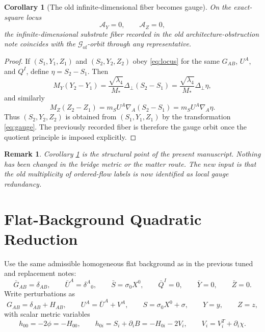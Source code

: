 \documentclass[11pt]{article}
\newcommand{\AY}{\mathcal A_Y}
\newcommand{\AZ}{\mathcal A_Z}
\newcommand{\GaugeGroup}{\mathscr G_{\mathrm{of}}}
\newtheorem{remark}{Remark}
\newtheorem{corollary}{Corollary}
\begin{document}
\begin{corollary}[The old infinite-dimensional fiber becomes gauge]
\label{cor:fiber}
On the exact-square locus
\begin{equation}
\AY=0,
\qquad
\AZ=0,
\label{eq:locus}
\end{equation}
the infinite-dimensional substrate fiber recorded in the old architecture-obstruction note coincides with the \(\GaugeGroup\)-orbit through any representative.
\end{corollary}

\begin{proof}
If \((S_1,Y_1,Z_1)\) and \((S_2,Y_2,Z_2)\) obey \eqref{eq:locus} for the same \(G_{AB}\), \(U^A\), and \(Q^I\), define \(\eta=S_2-S_1\). Then
\[
M_Y(Y_2-Y_1)
=
\frac{\sqrt{\lambda_4}}{M_*}\Delta_\perp(S_2-S_1)
=
\frac{\sqrt{\lambda_4}}{M_*}\Delta_\perp\eta,
\]
and similarly
\[
M_Z(Z_2-Z_1)
=
m_S U^A\nabla_A(S_2-S_1)
=
m_S U^A\nabla_A\eta.
\]
Thus \((S_2,Y_2,Z_2)\) is obtained from \((S_1,Y_1,Z_1)\) by the transformation \eqref{eq:gauge}. The previously recorded fiber is therefore the gauge orbit once the quotient principle is imposed explicitly.
\end{proof}

\begin{remark}
Corollary \ref{cor:fiber} is the structural point of the present manuscript. Nothing has been changed in the bridge metric or the matter route. The new input is that the old multiplicity of ordered-flow labels is now identified as local gauge redundancy.
\end{remark}

\section{Flat-Background Quadratic Reduction}

Use the same admissible homogeneous flat background as in the previous tuned and replacement notes:
\begin{equation}
\bar G_{AB}=\delta_{AB},
\qquad
\bar U^A=\delta^A{}_0,
\qquad
\bar S=\sigma_0X^0,
\qquad
\bar Q^I=0,
\qquad
\bar Y=0,
\qquad
\bar Z=0.
\label{eq:background}
\end{equation}
Write perturbations as
\begin{equation}
G_{AB}=\delta_{AB}+H_{AB},
\qquad
U^A=\bar U^A+V^A,
\qquad
S=\sigma_0X^0+\sigma,
\qquad
Y=y,
\qquad
Z=z,
\label{eq:perturb}
\end{equation}
with scalar metric variables
\begin{equation}
h_{00}=-2\phi=-H_{00},
\qquad
h_{0i}=S_i+\partial_iB=-H_{0i}-2V_i,
\qquad
V_i=V_i^T+\partial_i\chi.
\label{eq:metricpert}
\end{equation}
\end{document}
